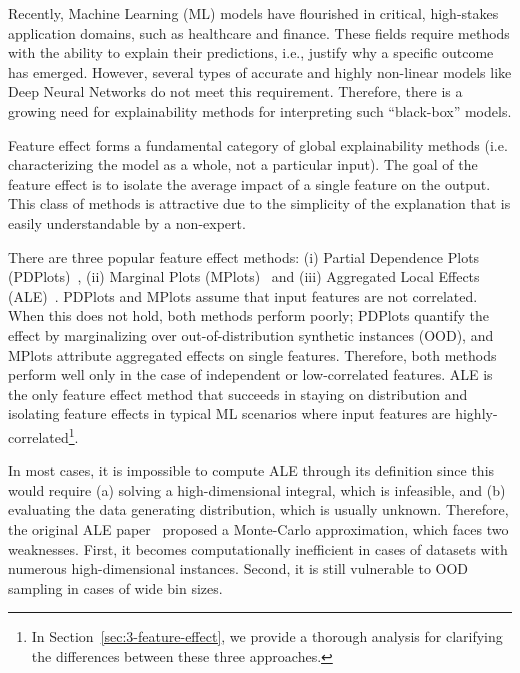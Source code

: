 Recently, Machine Learning (ML) models have flourished in critical, high-stakes application domains, such as healthcare and finance. These fields require methods with the ability to explain their predictions, i.e., justify why a specific outcome has emerged. However, several types of accurate and highly non-linear models like Deep Neural Networks do not meet this requirement. Therefore, there is a growing need for explainability methods for interpreting such ``black-box'' models.

Feature effect forms a fundamental category of global explainability methods (i.e. characterizing the model as a whole, not a particular input). The goal of the feature effect is to isolate the average impact of a single feature on the output. This class of methods is attractive due to the simplicity of the explanation that is easily understandable by a non-expert.

There are three popular feature effect methods: (i) Partial Dependence Plots (PDPlots)~\cite{Friedman2001}, (ii) Marginal Plots (MPlots)~\cite{Apley2020} and (iii) Aggregated Local Effects (ALE)~\cite{Apley2020}. PDPlots and MPlots assume that input features are not correlated. When this does not hold, both methods perform poorly; PDPlots quantify the effect by marginalizing over out-of-distribution synthetic instances (OOD), and MPlots attribute aggregated effects on single features. Therefore, both methods perform well only in the case of independent or low-correlated features. ALE is the only feature effect method that succeeds in staying on distribution and isolating feature effects in typical ML scenarios where input features are highly-correlated\footnote{In Section~\ref{sec:3-feature-effect}, we provide a thorough analysis for clarifying the differences between these three approaches.}.

In most cases, it is impossible to compute ALE through its definition since this would require (a) solving a high-dimensional integral, which is infeasible, and (b) evaluating the data generating distribution, which is usually unknown. Therefore, the original ALE paper~\cite{Apley2020} proposed a Monte-Carlo approximation, which faces two weaknesses. First, it becomes computationally inefficient in cases of datasets with numerous high-dimensional instances. Second, it is still vulnerable to OOD sampling in cases of wide bin sizes.

